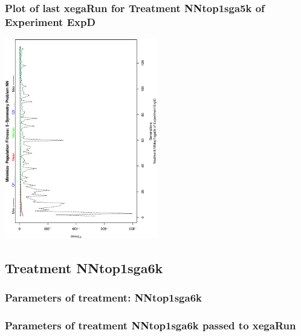 \documentclass[18pt,c]{beamer}
\makeatletter
\def\beamer@writeslidentry@miniframesoff{%
  \expandafter\beamer@ifempty\expandafter{\beamer@framestartpage}{}%
  {%
   \clearpage\beamer@notesactions%
  }
}
\newcommand*{\miniframesoff}{\let\beamer@writeslidentry=\beamer@writeslidentry@miniframesoff}
\makeatother
\begin{document}
 \begin{frame}
 \frametitle{ Plot of last xegaRun for Treatment NNtop1sga5k of Experiment ExpD }
 \begin{center}
\includegraphics[width=0.5\textwidth, angle=-90]
{ExpDPlotPopStatsFigure003.eps}
 \end{center}
 \label{report/ExpDPlotPopStatsFigure003.eps}  
 \end{frame}

\miniframesoff
\subsection{Treatment NNtop1sga6k}

 \begin{frame}
 \fontsize{8pt}{9pt}\selectfont
 \frametitle{  Parameters of treatment: NNtop1sga6k 
 }

 \label{ExpDtParmTable012.tex}  
 \end{frame}


 \begin{frame}
 \fontsize{8pt}{9pt}\selectfont
 \frametitle{  Parameters of treatment NNtop1sga6k passed to xegaRun
 }

 \label{ExpDtParmTable013.tex}  
 \end{frame}
\end{document}
